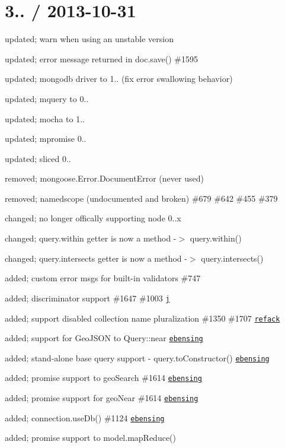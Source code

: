 \section*{3.. / 2013-\/10-\/31 }


\begin{DoxyItemize}
\item updated; warn when using an unstable version
\item updated; error message returned in doc.\+save() \#1595
\item updated; mongodb driver to 1.. (fix error swallowing behavior)
\item updated; mquery to 0..
\item updated; mocha to 1..
\item updated; mpromise 0..
\item updated; sliced 0..
\item removed; mongoose.\+Error.\+Document\+Error (never used)
\item removed; namedscope (undocumented and broken) \#679 \#642 \#455 \#379
\item changed; no longer offically supporting node 0..\+x
\item changed; query.\+within getter is now a method -\/$>$ query.\+within()
\item changed; query.\+intersects getter is now a method -\/$>$ query.\+intersects()
\item added; custom error msgs for built-\/in validators \#747
\item added; discriminator support \#1647 \#1003 \href{https://github.com/j}{\tt j}
\item added; support disabled collection name pluralization \#1350 \#1707 \href{https://github.com/refack}{\tt refack}
\item added; support for Geo\+J\+S\+ON to Query\+::near \href{https://github.com/ebensing}{\tt ebensing}
\item added; stand-\/alone base query support -\/ query.\+to\+Constructor() \href{https://github.com/ebensing}{\tt ebensing}
\item added; promise support to geo\+Search \#1614 \href{https://github.com/ebensing}{\tt ebensing}
\item added; promise support for geo\+Near \#1614 \href{https://github.com/ebensing}{\tt ebensing}
\item added; connection.\+use\+Db() \#1124 \href{https://github.com/ebensing}{\tt ebensing}
\item added; promise support to model.\+map\+Reduce()

\end{DoxyItemize}
